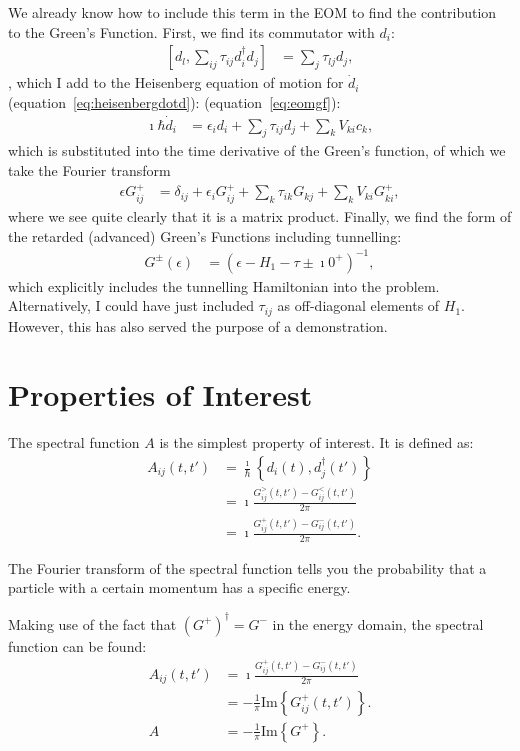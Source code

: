 We already know how to include this term in the EOM to find the contribution to the Green's Function. First, we find its commutator with $d_i$:
\begin{align*}
\left[ d_l, \sum_{ij} \tau_{ij} d_i^\dagger d_j\right] &= \sum_j \tau_{lj} d_j,
\end{align*}, which I add to the Heisenberg equation of motion for $\dot{d}_i$ (equation~\ref{eq:heisenbergdotd}): (equation~\ref{eq:eomgf}):
\begin{align*}
\imath \hbar \dot{d}_i 
&= \epsilon_i d_i +  \sum_{j} \tau_{ij} d_j + \sum_{k}V_{ki} c_{k},
\end{align*} which is substituted into the time derivative of the Green's function, of which we take the Fourier transform
\begin{align*}
\epsilon G_{ij}^+ &= \delta_{ij} + \epsilon_i G^+_{ij}+ \sum_k \tau_{ik} G_{kj} + \sum_k V_{ki} G^+_{ki},
\end{align*}
where we see quite clearly that it is a matrix product. Finally, we find the form of the retarded (advanced) Green's Functions including tunnelling:
\begin{align*}
G^\pm(\epsilon) &= \left(\epsilon - H_1 - \tau \pm \imath 0^+\right)^{-1},
\end{align*} which explicitly includes the tunnelling Hamiltonian into the problem. Alternatively, I could have just included $\tau_{ij}$ as off-diagonal elements of $H_1$. However, this has also served the purpose of a demonstration.


\section{Properties of Interest}
\label{sec:properties}
The spectral function $A$ is the simplest property of interest. It is defined as\cite{seldenthuis}:
\begin{align}
A_{ij}(t, t') &= \frac{\imath}{\hbar} \left\{ d_i(t), d_j^\dagger(t')\right\} \\
&= \imath \frac{ G^>_{ij}(t, t') - G^<_{ij}(t, t')}{2\pi} \\
&= \imath \frac{G^+_{ij}(t, t') - G^-_{ij}(t, t')}{2\pi}.
\label{eq:spectral}
\end{align}

The Fourier transform of the spectral function tells you the probability that a particle with a certain momentum has a specific energy. 

Making use of the fact that $\left(G^+\right)^\dagger = G^-$ in the energy domain, the spectral function can be found:
\begin{align*}
A_{ij}(t, t') &= \imath \frac{G^+_{ij}(t, t') - G^-_{ij}(t, t')}{2\pi}\\
&= - \frac{1}{\pi} \text{Im}\left\{ G^+_{ij}(t, t')\right\}. \\
A &=- \frac{1}{\pi} \text{Im}\left\{ G^+\right\}.
\end{align*}

